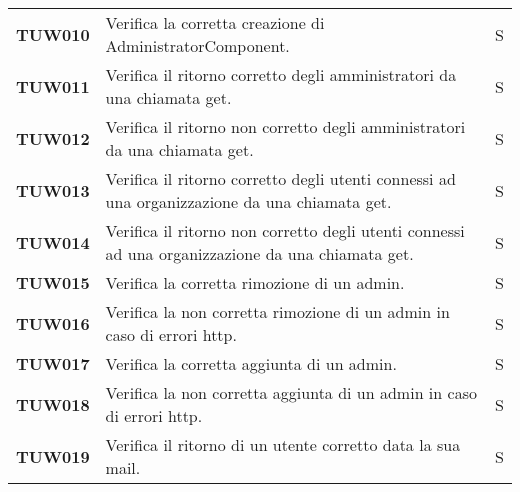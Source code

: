 \documentclass[../../piano-di-qualifica.tex]{subfiles}
\begin{document}
\begin{longtable}[H]{>{\centering\bfseries}m{3cm} >{}m{10cm} >{\centering\arraybackslash}m{3cm}}

  TUW010             & Verifica la corretta creazione di AdministratorComponent.                                                           & S                             \\

  TUW011             & Verifica il ritorno corretto degli amministratori da una chiamata get.                                              & S                             \\

  TUW012             & Verifica il ritorno non corretto degli amministratori da una chiamata get.                                          & S                             \\

  TUW013             & Verifica il ritorno corretto degli utenti connessi ad una organizzazione da una chiamata get.                       & S                             \\

  TUW014             & Verifica il ritorno non corretto degli utenti connessi ad una organizzazione da una chiamata get.                   & S                             \\

  TUW015             & Verifica la corretta rimozione di un admin.                                                                         & S                             \\

  TUW016             & Verifica la non corretta rimozione di un admin in caso di errori http.                                              & S                             \\

  TUW017             & Verifica la corretta aggiunta di un admin.                                                                          & S                             \\

  TUW018             & Verifica la non corretta aggiunta di un admin in caso di errori http.                                               & S                             \\

  TUW019             & Verifica il ritorno di un utente corretto data la sua mail.                                                         & S                             \\


\end{longtable}
\end{document}
